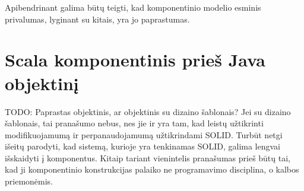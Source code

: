 Apibendrinant galima būtų teigti, kad  komponentinio
modelio esminis privalumas, lyginant su kitais, yra jo paprastumas.

\section{Scala komponentinis prieš Java objektinį}


TODO: Paprastas objektinis, ar objektinis su dizaino šablonais? Jei su
dizaino šablonais, tai pranašumo nebus, nes jie ir yra tam, kad
leistų užtikrinti modifikuojamumą ir perpanaudojamumą užtikrindami
SOLID. Turbūt netgi išeitų parodyti, kad sistemą, kurioje yra
tenkinamas SOLID, galima lengvai išskaidyti į komponentus.
Kitaip tariant vienintelis  pranašumas prieš
 būtų tai, kad ji komponentinio konstrukcijas
palaiko ne programavimo disciplina, o kalbos priemonėmis.
